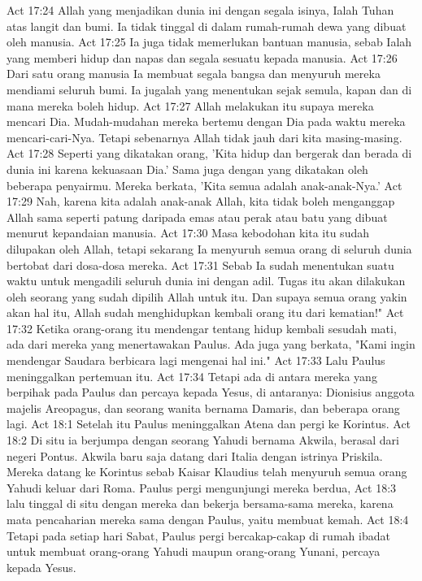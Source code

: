 Act 17:24  Allah yang menjadikan dunia ini dengan segala isinya, Ialah Tuhan atas langit dan bumi. Ia tidak tinggal di dalam rumah-rumah dewa yang dibuat oleh manusia.
Act 17:25  Ia juga tidak memerlukan bantuan manusia, sebab Ialah yang memberi hidup dan napas dan segala sesuatu kepada manusia.
Act 17:26  Dari satu orang manusia Ia membuat segala bangsa dan menyuruh mereka mendiami seluruh bumi. Ia jugalah yang menentukan sejak semula, kapan dan di mana mereka boleh hidup.
Act 17:27  Allah melakukan itu supaya mereka mencari Dia. Mudah-mudahan mereka bertemu dengan Dia pada waktu mereka mencari-cari-Nya. Tetapi sebenarnya Allah tidak jauh dari kita masing-masing.
Act 17:28  Seperti yang dikatakan orang, 'Kita hidup dan bergerak dan berada di dunia ini karena kekuasaan Dia.' Sama juga dengan yang dikatakan oleh beberapa penyairmu. Mereka berkata, 'Kita semua adalah anak-anak-Nya.'
Act 17:29  Nah, karena kita adalah anak-anak Allah, kita tidak boleh menganggap Allah sama seperti patung daripada emas atau perak atau batu yang dibuat menurut kepandaian manusia.
Act 17:30  Masa kebodohan kita itu sudah dilupakan oleh Allah, tetapi sekarang Ia menyuruh semua orang di seluruh dunia bertobat dari dosa-dosa mereka.
Act 17:31  Sebab Ia sudah menentukan suatu waktu untuk mengadili seluruh dunia ini dengan adil. Tugas itu akan dilakukan oleh seorang yang sudah dipilih Allah untuk itu. Dan supaya semua orang yakin akan hal itu, Allah sudah menghidupkan kembali orang itu dari kematian!"
Act 17:32  Ketika orang-orang itu mendengar tentang hidup kembali sesudah mati, ada dari mereka yang menertawakan Paulus. Ada juga yang berkata, "Kami ingin mendengar Saudara berbicara lagi mengenai hal ini."
Act 17:33  Lalu Paulus meninggalkan pertemuan itu.
Act 17:34  Tetapi ada di antara mereka yang berpihak pada Paulus dan percaya kepada Yesus, di antaranya: Dionisius anggota majelis Areopagus, dan seorang wanita bernama Damaris, dan beberapa orang lagi.
Act 18:1  Setelah itu Paulus meninggalkan Atena dan pergi ke Korintus.
Act 18:2  Di situ ia berjumpa dengan seorang Yahudi bernama Akwila, berasal dari negeri Pontus. Akwila baru saja datang dari Italia dengan istrinya Priskila. Mereka datang ke Korintus sebab Kaisar Klaudius telah menyuruh semua orang Yahudi keluar dari Roma. Paulus pergi mengunjungi mereka berdua,
Act 18:3  lalu tinggal di situ dengan mereka dan bekerja bersama-sama mereka, karena mata pencaharian mereka sama dengan Paulus, yaitu membuat kemah.
Act 18:4  Tetapi pada setiap hari Sabat, Paulus pergi bercakap-cakap di rumah ibadat untuk membuat orang-orang Yahudi maupun orang-orang Yunani, percaya kepada Yesus.
